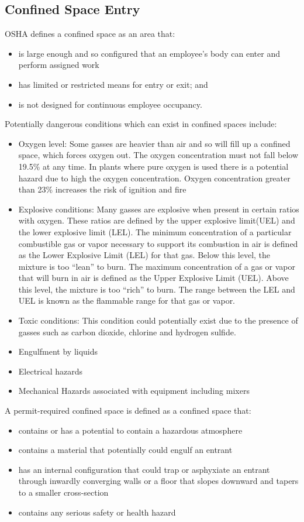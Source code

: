 \subsection{Confined Space Entry}
OSHA defines a confined space as an area that:
\begin{itemize} 
\item is large enough and so configured that an employee's body can enter and perform assigned work
\item has limited or restricted means for entry or exit; and
\item is not designed for continuous employee occupancy.
\end{itemize}
Potentially dangerous conditions which can exist in confined spaces include: 
\begin{itemize}
\item Oxygen level: Some gasses are heavier than air and so will fill up a confined space, which forces oxygen out.  The oxygen concentration must not fall below 19.5\% at any time.  In plants where pure oxygen is used there is a potential hazard due to high the oxygen concentration.  Oxygen concentration greater than 23\% increases the risk of ignition and fire
\item Explosive conditions:  Many gasses are explosive when present in certain ratios with oxygen. These ratios are defined by the upper explosive limit(UEL) and the lower explosive limit (LEL).  The minimum concentration of a particular combustible gas or vapor necessary to support its combustion in air is defined as the Lower Explosive Limit (LEL) for that gas. Below this level, the mixture is too “lean” to burn. The maximum concentration of a gas
or vapor that will burn in air is defined as the Upper Explosive Limit (UEL). Above this level, the mixture is too “rich” to burn.  The range between the LEL and UEL is known as the flammable range for that gas or vapor.  
\item Toxic conditions:  This condition could potentially exist due to the presence of gasses such as carbon dioxide, chlorine and hydrogen sulfide.
\item Engulfment by liquids
\item Electrical hazards
\item Mechanical Hazards associated with equipment including mixers
\end{itemize}

A permit-required confined space is defined as a confined space that:
\begin{itemize} 
\item contains or has a potential to contain a hazardous atmosphere
\item contains a material that potentially could engulf an entrant
\item has an internal configuration that could trap or asphyxiate an entrant through inwardly converging walls or a floor that slopes downward and tapers to a smaller cross-section
\item contains any serious safety or health hazard
\end{itemize}


